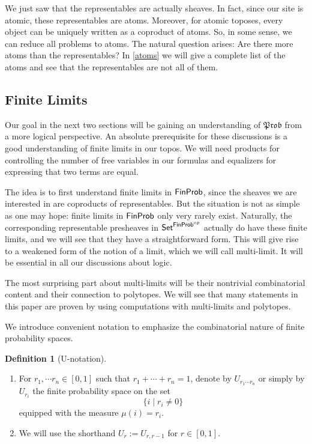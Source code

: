 \documentclass[a4paper]{amsproc}
\theoremstyle{plain}
\theoremstyle{definition}
\newtheorem{definition}[theorem]{Definition}
\theoremstyle{remark}
\numberwithin{equation}{section}
\newcommand{\Set}{\textup{\textsf{Set}}}
\newcommand{\FinProb}{\textup{\textsf{FinProb}}}
\newcommand{\Prob}{\mathfrak{Prob}}
\begin{document}
We just saw that the representables are actually sheaves. In fact, since our site is atomic, these representables are atoms. Moreover, for atomic toposes, every object can be uniquely written as a coproduct of atoms. So, in some sense, we can reduce all problems to atoms. The natural question arises: Are there more atoms than the representables? In \ref{atoms} we will give a complete list of the atoms and see that the representables are not all of them.


\subsection{Finite Limits}

Our goal in the next two sections will be gaining an understanding of $\Prob$ from a more logical perspective. An absolute prerequisite for these discussions is a good understanding of finite limits in our topos. We will need products for controlling the number of free variables in our formulas and equalizers for expressing that two terms are equal.

The idea is to first understand finite limits in $\FinProb$, since the sheaves we are interested in are coproducts of representables. But the situation is not as simple as one may hope: finite limits in $\FinProb$ only very rarely exist. Naturally, the corresponding representable presheaves in $\Set^{\FinProb^{op}}$ actually do have these finite limits, and we will see that they have a straightforward form. This will give rise to a weakened form of the notion of a limit, which we will call multi-limit. It will be essential in all our discussions about logic.

The most surprising part about multi-limits will be their nontrivial combinatorial content and their connection to polytopes. We will see that many statements in this paper are proven by using computations with multi-limits and polytopes.

We introduce convenient notation to emphasize the combinatorial nature of finite probability spaces.

\begin{definition}[U-notation] \label{U-notation}
    \mbox{}
    \begin{enumerate}
        \item For $r_1, \cdots r_n \in [0,1]$ such that $r_1 + \cdots + r_n = 1$, denote by $U_{r_1 \cdots r_n}$ or simply by $U_{r_i}$ the finite probability space on the set
        \[
        \{i \mid r_i \neq 0 \}
        \]
        equipped with the measure $\mu(i) = r_i$.
        \item We will use the shorthand $U_r := U_{r,r-1}$ for $r \in [0,1]$.
    \end{enumerate}
\end{definition}
\end{document}
